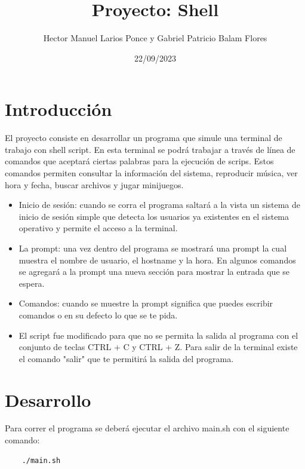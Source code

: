 \documentclass[titlepage]{article}
\title{Proyecto: Shell}
\author{Hector Manuel Larios Ponce y Gabriel Patricio Balam Flores}
\date{22/09/2023}
\begin{document}
\maketitle
\tableofcontents
\pagebreak

\section{Introducción}
El proyecto consiste en desarrollar un programa que simule una terminal de trabajo con shell script. En esta terminal se podrá trabajar a través de línea de comandos que aceptará ciertas palabras para la ejecución de scrips. Estos comandos permiten consultar la información del sistema, reproducir música, ver hora y fecha, buscar archivos y jugar minijuegos.
\\
\begin{itemize}
\item Inicio de sesión: cuando se corra el programa saltará a la vista un sistema de inicio de sesión simple que detecta los usuarios ya existentes en el sistema operativo y permite el acceso a la terminal. 

\item La prompt: una vez dentro del programa se mostrará una prompt la cual muestra el nombre de usuario, el hostname y la hora. En algunos comandos se agregará a la prompt una nueva sección para mostrar la entrada que se espera.

\item Comandos: cuando se muestre la prompt significa que puedes escribir comandos o en su defecto lo que se te pida.

\item El script fue modificado para que no se permita la salida al programa con el conjunto de teclas CTRL + C y CTRL + Z. Para salir de la terminal existe el comando "salir" que te permitirá la salida del programa.

\end{itemize}

\newpage
\section{Desarrollo}

Para correr el programa se deberá ejecutar el archivo main.sh con el siguiente comando:
\begin{verbatim}
    ./main.sh
\end{verbatim}
\end{document}
